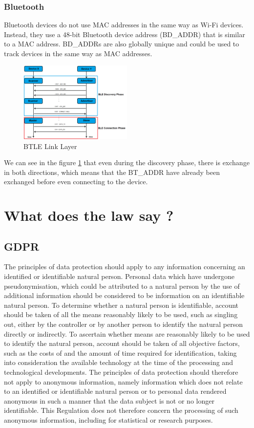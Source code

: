 \documentclass[aps,prb,twocolumn,superscriptaddress,floatfix,longbibliography,nofootinbib]{revtex4-2}
\begin{document}
    \subsubsection{\label{subsec:Bluetooth}Bluetooth}
    Bluetooth devices do not use MAC addresses in the same way as Wi-Fi devices.
    Instead, they use a 48-bit Bluetooth device address (BD\_ADDR) that is similar to a MAC address.
    BD\_ADDRs are also globally unique and could be used to track devices in the same way as MAC addresses.
    \begin{figure}[H]
        \centering
        \includegraphics[width=0.5\textwidth]{pictures/Link-Layer-Roles-Change_ver1.png}
        \caption{BTLE Link Layer \cite{BLE5}}
        \label{fig:BT}
    \end{figure}
    We can see in the figure \ref{fig:BT} that even during the discovery phase, there
    is exchange in both directions, which means that the BT\_ADDR have already been 
    exchanged before even connecting to the device.


\section{\label{sec:Law}What does the law say ?}
  \subsection{\label{subsec:GDPR}GDPR}
  The principles of data protection should apply to any information concerning an
  identified or identifiable natural person. 
  Personal data which have undergone pseudonymisation, which could be attributed to a natural person by
  the use of additional information should be considered to be information on an identifiable natural person. To
  determine whether a natural person is identifiable, account should be taken of all the means reasonably likely to
  be used, such as singling out, either by the controller or by another person to identify the natural person directly
  or indirectly. To ascertain whether means are reasonably likely to be used to identify the natural person, account
  should be taken of all objective factors, such as the costs of and the amount of time required for identification,
  taking into consideration the available technology at the time of the processing and technological developments.
  The principles of data protection should therefore not apply to anonymous information, namely information
  which does not relate to an identified or identifiable natural person or to personal data rendered anonymous in
  such a manner that the data subject is not or no longer identifiable. This Regulation does not therefore concern
  the processing of such anonymous information, including for statistical or research purposes.\cite{GDPR2016}
\end{document}
